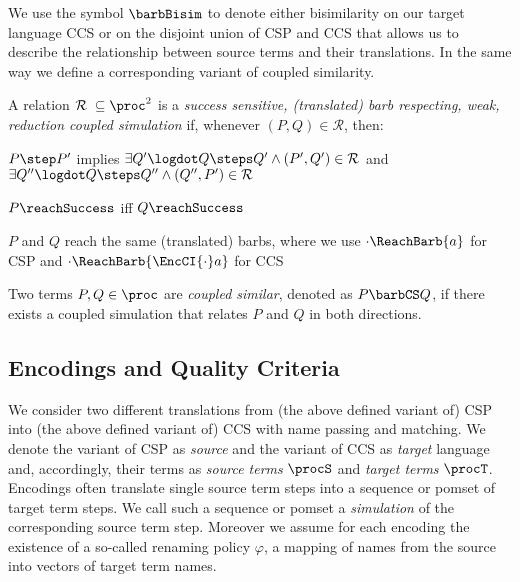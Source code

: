 \documentclass[]{eptcs}
\begin{document}
\noindent
We use the symbol $ \barbBisim $ to denote either bisimilarity on our target language CCS or on the disjoint union of CSP and CCS that allows us to describe the relationship between source terms and their translations. In the same way we define a corresponding variant of coupled similarity.

\begin{definition}
	A relation $ \mathcal{R} \; \subseteq \proc^2 $ is a \emph{success sensitive, (translated) barb respecting, weak, reduction coupled simulation} if, whenever $ \left( P, Q \right) \in \mathcal{R} $, then:
	\begin{compactitem}
		\item $ P \step P' $ implies $ \exists Q'\logdot Q \steps Q' \wedge \left( P', Q' \right) \in \mathcal{R} $ and $ \exists Q''\logdot Q \steps Q'' \wedge \left( Q'', P' \right) \in \mathcal{R} $
		\item $ P\reachSuccess $ iff $ Q\reachSuccess $
		\item $ P $ and $ Q $ reach the same (translated) barbs, where we use $ \cdot\ReachBarb{a} $ for CSP and $ \cdot\ReachBarb{\EncCI{\cdot}a} $ for CCS
	\end{compactitem}
	Two terms $ P, Q \in \proc $ are \emph{coupled similar}, denoted as $ P \barbCS Q $, if there exists a coupled simulation that relates $ P $ and $ Q $ in both directions.
\end{definition}

\subsection{Encodings and Quality Criteria}

We consider two different translations from (the above defined variant of) CSP into (the above defined variant of) CCS with name passing and matching. We denote the variant of CSP as \emph{source} and the variant of CCS as \emph{target} language and, accordingly, their terms as \emph{source terms} $ \procS $ and \emph{target terms} $ \procT $. Encodings often translate single source term steps into a sequence or pomset of target term steps. We call such a sequence or pomset a \emph{simulation} of the corresponding source term step.
Moreover we assume for each encoding the existence of a so-called renaming policy $ \varphi $, \ie a mapping of names from the source into vectors of target term names.
\end{document}
